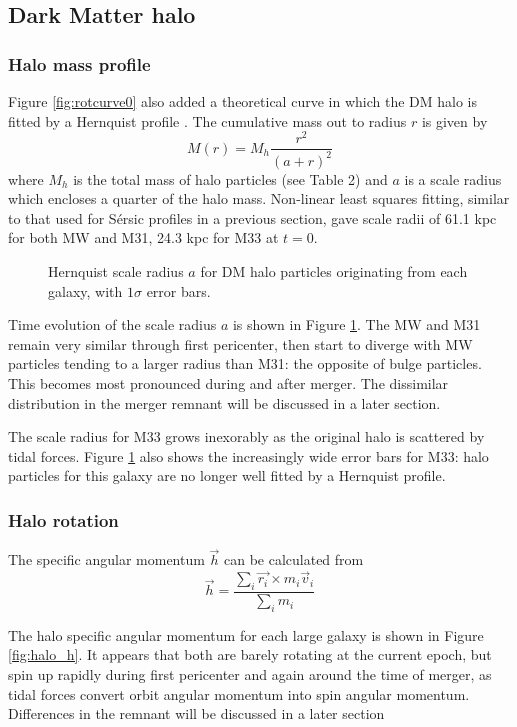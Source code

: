 \documentclass[twocolumn]{aastex63}
\begin{document}
\subsection{Dark Matter halo}

\subsubsection{Halo mass profile}

Figure \ref{fig:rotcurve0} also added a theoretical curve in which the DM halo is fitted by a Hernquist profile \citep{hernquist_analytical_1990}. The cumulative mass out to radius $r$ is given by
\[ M(r) = M_h \frac{r^2}{(a+r)^2} \]
where $M_h$ is the total mass of halo particles (see Table 2) and $a$ is a scale radius which encloses a quarter of the halo mass. Non-linear least squares fitting, similar to that used for Sérsic profiles in a previous section, gave scale radii of 61.1 kpc for both MW and M31, 24.3 kpc for M33 at $t=0$.

\begin{figure}[htb!]
	\caption{Hernquist scale radius $a$ for DM halo particles originating from each galaxy, with $1\sigma$ error bars.
		\label{fig:hernquist_a}}
\end{figure}

Time evolution of the scale radius $a$ is shown in Figure \ref{fig:hernquist_a}. The MW and M31 remain very similar through first pericenter, then start to diverge with MW particles tending to a larger radius than M31: the opposite of bulge particles. This becomes most pronounced during and after merger. The dissimilar distribution in the merger remnant will be discussed in a later section.  

The scale radius for M33 grows inexorably as the original halo is scattered by tidal forces. Figure \ref{fig:hernquist_a} also shows the increasingly wide error bars for M33: halo particles for this galaxy are no longer well fitted by a Hernquist profile.

\subsubsection{Halo rotation}

The specific angular momentum $\vec{h}$ can be calculated from
\[ \vec{h} = \frac{\sum_i{\vec{r_i} \times m_i \vec{v}_i}}{\sum_i{m_i}} \]

The halo specific angular momentum for each large galaxy is shown in Figure \ref{fig:halo_h}. It appears that both are barely rotating at the current epoch, but spin up rapidly during first pericenter and again around the time of merger, as tidal forces convert orbit angular momentum into spin angular momentum. Differences in the remnant will be discussed in a later section
\end{document}
